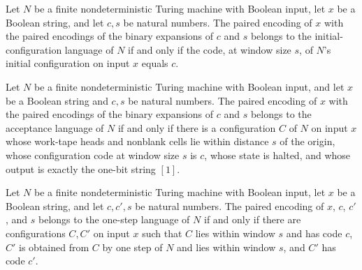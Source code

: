 \begin{theorem}
\label{Complexity.Codec.mem_initLang}
\leanok
{}
Let $N$ be a finite nondeterministic Turing machine with Boolean input, let $x$ be a
Boolean string, and let $c,s$ be natural numbers. The paired encoding of $x$ with the
paired encodings of the binary expansions of $c$ and $s$ belongs to the
initial-configuration language of $N$ if and only if the code, at window size $s$, of
$N$'s initial configuration on input $x$ equals $c$.
\end{theorem}

\begin{theorem}
\label{Complexity.Codec.mem_acceptLang}
\leanok
{}
Let $N$ be a finite nondeterministic Turing machine with Boolean input, and let $x$ be a
Boolean string and $c,s$ be natural numbers. The paired encoding of $x$ with the paired
encodings of the binary expansions of $c$ and $s$ belongs to the acceptance language of
$N$ if and only if there is a configuration $C$ of $N$ on input $x$ whose work-tape
heads and nonblank cells lie within distance $s$ of the origin, whose configuration code
at window size $s$ is $c$, whose state is halted, and whose output is exactly the
one-bit string $[1]$.
\end{theorem}

\begin{theorem}
\label{Complexity.Codec.mem_stepLang}
\leanok
{}
Let $N$ be a finite nondeterministic Turing machine with Boolean input, let $x$ be a
Boolean string, and let $c,c',s$ be natural numbers. The paired encoding of $x$, $c$,
$c'$, and $s$ belongs to the one-step language of $N$ if and only if there are
configurations $C,C'$ on input $x$ such that $C$ lies within window $s$ and has code
$c$, $C'$ is obtained from $C$ by one step of $N$ and lies within window $s$, and $C'$
has code $c'$.
\end{theorem}

